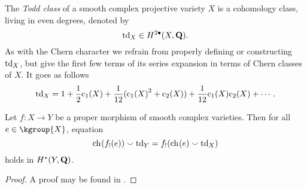 The \emph{Todd class} of a smooth complex projective variety $X$ is a cohomology class, living in even degrees, denoted by
\[
    \operatorname{td}_{X} \in H^{2\bullet}(X, \mathbf Q).
\]
As with the Chern character we refrain from properly defining or constructing $\operatorname{td}_{X}$, but give the first few terms of its series expansion in terms of Chern classes of $X$. It goes as follows
\[
    \tdclass{X} = 1 + \frac{1}{2}\cclass[1](X) + \frac{1}{12}(\cclass[1]{X}^2 + \cclass[2]{X}) + \frac{1}{12}\cclass[1](X)\cclass[2](X) + \cdots.
\] 





\begin{theorem}
    \label{Grothendieck-Riemann-Roch}
    Let $f \colon X \to Y$ be a proper morphism of smooth complex varieties. Then for all $e \in \kgroup{X}$, equation 
    \begin{equation}
        \label{eq: GRR}
        \ch[]{f_!(e)} \smallsmile \tdclass{Y} = f_!(\ch[]{e} \smallsmile \tdclass{X})
    \end{equation}
    holds in $H^{*}(Y, \mathbf Q)$.
\end{theorem}

\begin{proof}
    A proof may be found in \cite[\S 15]{Fulton1998}.
\end{proof}

